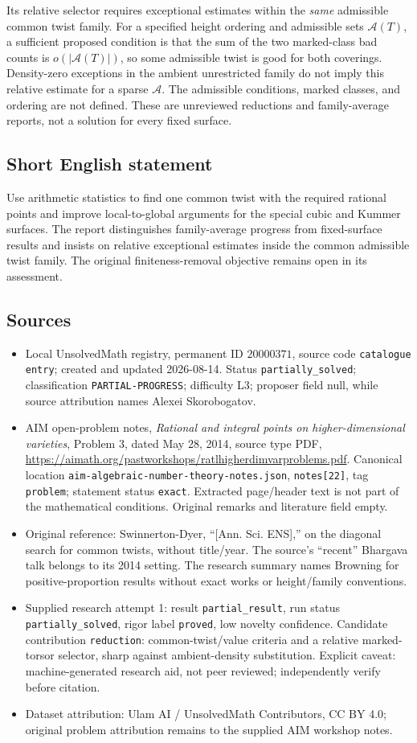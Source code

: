 \documentclass[11pt]{article}
\begin{document}
Its relative selector requires exceptional estimates within the \emph{same} admissible common twist family. For a specified height ordering and admissible sets $\mathcal A(T)$, a sufficient proposed condition is that the sum of the two marked-class bad counts is $o(|\mathcal A(T)|)$, so some admissible twist is good for both coverings. Density-zero exceptions in the ambient unrestricted family do not imply this relative estimate for a sparse $\mathcal A$. The admissible conditions, marked classes, and ordering are not defined. These are unreviewed reductions and family-average reports, not a solution for every fixed surface.
\subsection{Short English statement}
Use arithmetic statistics to find one common twist with the required rational points and improve local-to-global arguments for the special cubic and Kummer surfaces. The report distinguishes family-average progress from fixed-surface results and insists on relative exceptional estimates inside the common admissible twist family. The original finiteness-removal objective remains open in its assessment.
\subsection{Sources}
\begin{itemize}
\item Local UnsolvedMath registry, permanent ID $20000371$, source code \texttt{catalogue entry}; created and updated 2026-08-14. Status \texttt{partially\_solved}; classification \texttt{PARTIAL-PROGRESS}; difficulty L3; proposer field null, while source attribution names Alexei Skorobogatov.
\item AIM open-problem notes, \emph{Rational and integral points on higher-dimensional varieties}, Problem 3, dated May 28, 2014, source type PDF, \url{https://aimath.org/pastworkshops/ratlhigherdimvarproblems.pdf}. Canonical location \texttt{aim-algebraic-number-theory-notes.json}, \texttt{notes[22]}, tag \texttt{problem}; statement status \texttt{exact}. Extracted page/header text is not part of the mathematical conditions. Original remarks and literature field empty.
\item Original reference: Swinnerton-Dyer, ``[Ann. Sci. ENS],'' on the diagonal search for common twists, without title/year. The source's ``recent'' Bhargava talk belongs to its 2014 setting. The research summary names Browning for positive-proportion results without exact works or height/family conventions.
\item Supplied research attempt 1: result \texttt{partial\_result}, run status \texttt{partially\_solved}, rigor label \texttt{proved}, low novelty confidence. Candidate contribution \texttt{reduction}: common-twist/value criteria and a relative marked-torsor selector, sharp against ambient-density substitution. Explicit caveat: machine-generated research aid, not peer reviewed; independently verify before citation.
\item Dataset attribution: Ulam AI / UnsolvedMath Contributors, CC BY 4.0; original problem attribution remains to the supplied AIM workshop notes.
\end{itemize}
\end{document}
